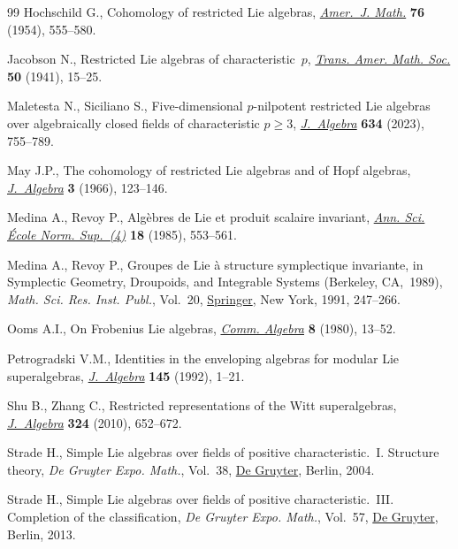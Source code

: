 \documentclass[pdftex]{sigma}
\numberwithin{equation}{section}
\begin{document}
\begin{thebibliography}{99}
Hochschild G., Cohomology of restricted {L}ie algebras, \href{https://doi.org/10.2307/2372701}{\textit{Amer.~J. Math.}}
 \textbf{76} (1954), 555--580.

Jacobson N., Restricted {L}ie algebras of characteristic~{$p$}, \href{https://doi.org/10.2307/1989908}{\textit{Trans.
 Amer. Math. Soc.}} \textbf{50} (1941), 15--25.

Maletesta N., Siciliano S., Five-dimensional {$p$}-nilpotent restricted {L}ie
 algebras over algebraically closed fields of characteristic {$p\geq3$},
 \href{https://doi.org/10.1016/j.jalgebra.2023.05.029}{\textit{J.~Algebra}} \textbf{634} (2023), 755--789.

May J.P., The cohomology of restricted {L}ie algebras and of {H}opf algebras,
 \href{https://doi.org/10.1016/0021-8693(66)90009-3}{\textit{J.~Algebra}} \textbf{3} (1966), 123--146.

Medina A., Revoy P., Alg\`ebres de {L}ie et produit scalaire invariant,
 \href{https://doi.org/10.24033/asens.1496}{\textit{Ann. Sci. \'Ecole Norm. Sup.~(4)}} \textbf{18} (1985), 553--561.

Medina A., Revoy P., Groupes de {L}ie \`a structure symplectique invariante, in
 Symplectic {G}eometry, {D}roupoids, and {I}ntegrable {S}ystems ({B}erkeley,
 {CA},~1989), \textit{Math. Sci. Res. Inst. Publ.}, Vol.~20, \href{https://doi.org/10.1007/978-1-4613-9719-9_17}{Springer}, New
 York, 1991, 247--266.

Ooms A.I., On {F}robenius {L}ie algebras, \href{https://doi.org/10.1080/00927878008822445}{\textit{Comm. Algebra}} \textbf{8}
 (1980), 13--52.

Petrogradski V.M., Identities in the enveloping algebras for modular {L}ie
 superalgebras, \href{https://doi.org/10.1016/0021-8693(92)90173-J}{\textit{J.~Algebra}} \textbf{145} (1992), 1--21.

Shu B., Zhang C., Restricted representations of the {W}itt superalgebras,
 \href{https://doi.org/10.1016/j.jalgebra.2010.04.032}{\textit{J.~Algebra}} \textbf{324} (2010), 652--672.

Strade H., Simple {L}ie algebras over fields of positive characteristic.~{I}.
 {S}tructure theory, \textit{De Gruyter Expo. Math.}, Vol.~38, \href{https://doi.org/10.1515/9783110197945}{De Gruyter},
 Berlin, 2004.

Strade H., Simple {L}ie algebras over fields of positive characteristic.~{III}.
 {C}ompletion of the classification, \textit{De Gruyter Expo. Math.}, Vol.~57,
 \href{https://doi.org/10.1515/9783110263015}{De Gruyter}, Berlin, 2013.


\end{thebibliography}
\end{document}
